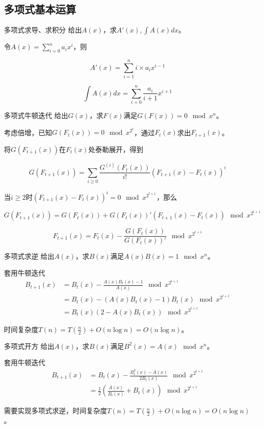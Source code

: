 \documentclass{beamer}
\begin{document}
	\subsection{多项式基本运算}
	\begin{frame}{多项式求导、求积分}
		给出$A(x)$，求$A'(x),\int A(x)dx$。
		
		令$A(x)=\sum_{i=0}^na_ix^i$，则
		
		$$A'(x)=\sum_{i=1}^{n}i\times a_{i}x^{i-1}$$
		
		$$\int A(x)dx=\sum_{i=0}^n\frac{a_i}{i+1}x^{i+1}$$
	\end{frame}
	\begin{frame}{多项式牛顿迭代}
		给出$G(x)$，求$F(x)$满足$G(F(x)) = 0 \mod x^n$。
		
		考虑倍增，已知$G(F_t(x)) = 0 \mod x^{2^t}$，通过$F_t(x)$求出$F_{t+1}(x)$。
		
		将$G(F_{t+1}(x))$在$F_t(x)$处泰勒展开，得到
		
		$$G(F_{t+1}(x))=\sum_{i\ge 0}\frac{G^{(i)}(F_t(x))}{i!}(F_{t+1}(x)-F_t(x))^i$$
		
		当$i \ge 2$时$(F_{t+1}(x)-F_t(x))^i = 0 \mod x^{2^{t+1}}$，那么
		
		$$G(F_{t+1}(x))=G(F_t(x))+G(F_t(x))'(F_{t+1}(x)-F_t(x)) \mod x^{2^{t+1}}$$

		$$F_{t+1}(x)=F_t(x)-\frac{G(F_t(x))}{G(F_t(x))'} \mod x^{2^{t+1}}$$
	\end{frame}
	\begin{frame}{多项式求逆}
		给出$A(x)$，求$B(x)$满足$A(x)B(x)=1 \mod x^n$。
		
		套用牛顿迭代
		$$\begin{aligned}B_{t+1}(x)&=B_t(x)-\frac{A(x)B_t(x)-1}{A(x)} \mod x^{2^{t+1}}\\&=B_t(x)-(A(x)B_t(x)-1)B_t(x)\mod x^{2^{t+1}}\\&=B_t(x)(2-A(x)B_t(x))\mod x^{2^{t+1}}\end{aligned}$$ 
		
		时间复杂度$T(n)=T(\frac n2)+O(n\log n)=O(n\log n)$。
	\end{frame}
	\begin{frame}{多项式开方}
		给出$A(x)$，求$B(x)$满足$B^2(x)=A(x) \mod x^n$。
		
		套用牛顿迭代
		$$\begin{aligned}B_{t+1}(x)&=B_t(x)-\frac{B_t^2(x)-A(x)}{2B_t(x)} \mod x^{2^{t+1}}\\&=\frac{1}{2}(\frac{A(x)}{B_t(x)}+B_t(x))\mod x^{2^{t+1}}\end{aligned}$$ 
		
		需要实现多项式求逆，时间复杂度$T(n)=T(\frac n2)+O(n\log n)=O(n\log n)$。
	\end{frame}
\end{document}
